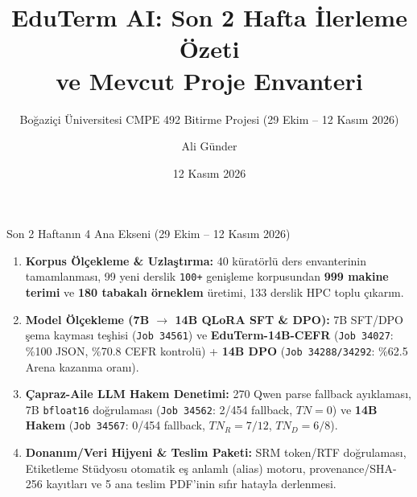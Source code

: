 \documentclass[aspectratio=169,10pt]{beamer}
\title[EduTerm AI -- Son 2 Hafta \& Envanter]{EduTerm AI: Son 2 Hafta İlerleme Özeti\\ve Mevcut Proje Envanteri}
\subtitle{Boğaziçi Üniversitesi CMPE 492 Bitirme Projesi (29 Ekim -- 12 Kasım 2026)}
\author{Ali Günder}
\institute{Bilgisayar Mühendisliği Bölümü, Boğaziçi Üniversitesi}
\date{12 Kasım 2026}
\begin{document}
\begin{frame}
\titlepage
\vspace{-0.4cm}
\begin{block}{Son 2 Haftanın 4 Ana Ekseni (29 Ekim -- 12 Kasım 2026)}
\scriptsize
\begin{enumerate}
    \item \textbf{Korpus Ölçekleme \& Uzlaştırma:} 40 küratörlü ders envanterinin tamamlanması, 99 yeni derslik \texttt{100+} genişleme korpusundan \textbf{999 makine terimi} ve \textbf{180 tabakalı örneklem} üretimi, 133 derslik HPC toplu çıkarım.
    \item \textbf{Model Ölçekleme (7B $\to$ 14B QLoRA SFT \& DPO):} 7B SFT/DPO şema kayması teşhisi (\texttt{Job 34561}) ve \textbf{EduTerm-14B-CEFR} (\texttt{Job 34027}: \%100 JSON, \%70.8 CEFR kontrolü) + \textbf{14B DPO} (\texttt{Job 34288/34292}: \%62.5 Arena kazanma oranı).
    \item \textbf{Çapraz-Aile LLM Hakem Denetimi:} 270 Qwen parse fallback ayıklaması, 7B \texttt{bfloat16} doğrulaması (\texttt{Job 34562}: 2/454 fallback, $TN=0$) ve \textbf{14B Hakem} (\texttt{Job 34567}: 0/454 fallback, $TN_R=7/12$, $TN_D=6/8$).
    \item \textbf{Donanım/Veri Hijyeni \& Teslim Paketi:} SRM token/RTF doğrulaması, Etiketleme Stüdyosu otomatik eş anlamlı (alias) motoru, provenance/SHA-256 kayıtları ve 5 ana teslim PDF'inin sıfır hatayla derlenmesi.
\end{enumerate}
\end{block}
\end{frame}
\end{document}
